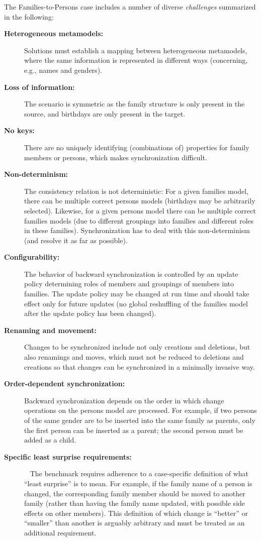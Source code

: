 The Families-to-Persons case includes a number of diverse \emph{challenges} summarized in the following:

\begin{description}
	\item[\textbf{Heterogeneous metamodels:}] 
	Solutions must establish a mapping between heterogeneous metamodels, where the same information is represented in different ways (concerning, e.g., names and genders).
	
	\item[\textbf{Loss of information:}] 
	The scenario is symmetric as the family structure is only present in the source, and birthdays are only present in the target.
	
	\item[\textbf{No keys:}] 
	There are no uniquely identifying (combinations of) properties for family members or persons, which makes synchronization difficult.
	
	\item[\textbf{Non-determinism:}] 
	The consistency relation is not de\-ter\-mi\-ni\-stic: For a given families model, there can be multiple correct persons models (birthdays may be arbitrarily selected). 
	Likewise, for a given persons model there can be multiple correct families models (due to different groupings into families and different roles in these families). Synchronization has to deal with this non-determinism (and resolve it as far as possible).
	
	\item[\textbf{Configurability:}] 
	The behavior of backward synchronization is controlled by an update policy determining roles of members and groupings of members into families. 
	The update policy may be changed at run time and should take effect only for future updates (no global reshuffling of the families model after the update policy has been changed).
	
	\item[\textbf{Renaming and movement:}] 
	Changes to be synchronized include not only creations and deletions, but also renamings and moves, which must not be reduced to deletions and creations so that changes can be synchronized in a minimally invasive way. 
	
	\item[\textbf{Order-dependent synchronization:}] 
	Backward synchronization depends on the order in which change operations on the persons model are processed. 
	For example, if two persons of the same gender are to be inserted into the same family as parents, only the first person can be inserted as a parent; the second person must be added as a child.
	
	\item[\textbf{Specific least surprise requirements:}]~
	The bench\-mark requires adherence to a case-specific definition of what ``least surprise'' is to mean.
	For example, if the family name of a person is changed, the corresponding family member should be moved to another family (rather than having the family name updated, with possible side effects on other members).
	This definition of which change is ``better'' or ``smaller'' than another is arguably arbitrary and must be treated as an additional requirement.
\end{description}